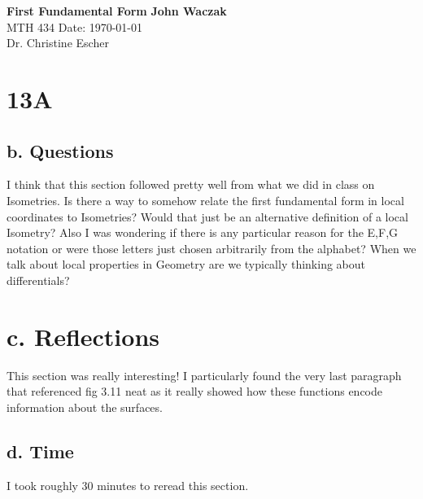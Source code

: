 \documentclass[a4paper, 11pt]{article}
\begin{document}
	\noindent
	\large\textbf{First Fundamental Form} \hfill \textbf{John Waczak} \\
	\normalsize MTH 434 \hfill  Date: \today \\
	Dr. Christine Escher \\
	
\section*{13A}
	\subsection*{b. Questions}
	I think that this section followed pretty well from what we did in class on Isometries. Is there a way to somehow relate the first fundamental form in local coordinates to Isometries? Would that just be an alternative definition of a local Isometry? Also I was wondering if there is any particular reason for the E,F,G notation or were those letters just chosen arbitrarily from the alphabet? When we talk about local properties in Geometry are we typically thinking about differentials? 
	
	\section*{c. Reflections}
	This section was really interesting!  I particularly found the very last paragraph that referenced fig 3.11 neat as it really showed how these functions encode information about the surfaces. 
	
	
	\subsection*{d. Time}
	I took roughly 30 minutes to reread this section. 
	
\end{document}
